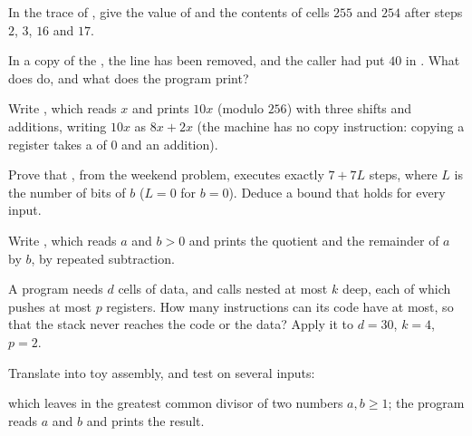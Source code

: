 \begin{exercise}[$\star\star$]\label{exo:g11:von-neumann-machine:9}
In the trace of , give the value of  and the contents of cells $255$ and $254$ after
steps $2$, $3$, $16$ and $17$.
\end{exercise}

\begin{exercise}[$\star\star$]\label{exo:g11:von-neumann-machine:10}
In a copy of the , the line  has been removed, and the caller had put $40$ in . What
does  do, and what does the program print?
\end{exercise}

\begin{exercise}[$\star\star$]\label{exo:g11:von-neumann-machine:11}
Write , which reads $x$ and prints $10x$ (modulo $256$) with three shifts and additions,
writing $10x$ as $8x + 2x$ (the machine has no copy instruction: copying a register takes a  of $0$ and
an addition).
\end{exercise}

\begin{exercise}[$\star\star\star$]\label{exo:g11:von-neumann-machine:12}
Prove that , from the weekend problem, executes exactly $7 + 7L$ steps, where $L$ is the
number of bits of $b$ ($L = 0$ for $b = 0$). Deduce a bound that holds for every input.
\end{exercise}

\begin{exercise}[$\star\star\star$]\label{exo:g11:von-neumann-machine:13}
Write , which reads $a$ and $b > 0$ and prints the quotient and the remainder of $a$ by $b$, by
repeated subtraction.
\end{exercise}

\begin{exercise}[$\star\star\star$]\label{exo:g11:von-neumann-machine:14}
A program needs $d$ cells of data, and calls  nested at most $k$ deep, each of which pushes at most $p$
registers. How many instructions can its code have at most, so that the stack never reaches the code or the data?
Apply it to $d = 30$, $k = 4$, $p = 2$.
\end{exercise}

\begin{exercise}[$\star\star\star$]\label{exo:g11:von-neumann-machine:15}
Translate into toy assembly, and test on several inputs:

\smallskip\noindent\hspace*{2em}  

\smallskip\noindent which leaves in  the greatest common divisor of two numbers $a, b \ge 1$; the program
reads $a$ and $b$ and prints the result.
\end{exercise}

